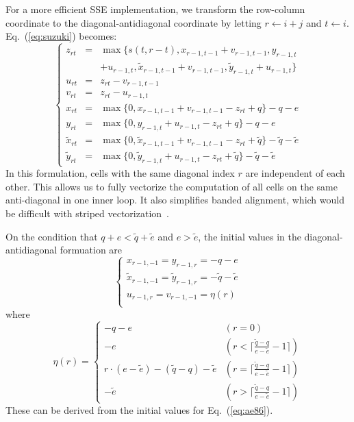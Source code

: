 \documentclass{bioinfo}
\begin{document}
\begin{methods}
For a more efficient SSE implementation, we transform the row-column coordinate
to the diagonal-antidiagonal coordinate by letting $r\gets i+j$ and $t\gets i$.
Eq.~(\ref{eq:suzuki}) becomes:
\begin{equation*}
\left\{\begin{array}{lll}
z_{rt}&=&\max\{s(t,r-t),x_{r-1,t-1}+v_{r-1,t-1},y_{r-1,t}\\
&&+u_{r-1,t},\tilde{x}_{r-1,t-1}+v_{r-1,t-1},\tilde{y}_{r-1,t}+u_{r-1,t}\}\\
u_{rt}&=&z_{rt}-v_{r-1,t-1}\\
v_{rt}&=&z_{rt}-u_{r-1,t}\\
x_{rt}&=&\max\{0,x_{r-1,t-1}+v_{r-1,t-1}-z_{rt}+q\}-q-e\\
y_{rt}&=&\max\{0,y_{r-1,t}+u_{r-1,t}-z_{rt}+q\}-q-e\\
\tilde{x}_{rt}&=&\max\{0,\tilde{x}_{r-1,t-1}+v_{r-1,t-1}-z_{rt}+\tilde{q}\}-\tilde{q}-\tilde{e}\\
\tilde{y}_{rt}&=&\max\{0,\tilde{y}_{r-1,t}+u_{r-1,t}-z_{rt}+\tilde{q}\}-\tilde{q}-\tilde{e}
\end{array}\right.
\end{equation*}
In this formulation, cells with the same diagonal index $r$ are independent of
each other. This allows us to fully vectorize the computation of all cells on
the same anti-diagonal in one inner loop. It also simplifies banded alignment,
which would be difficult with striped vectorization~\citep{Farrar:2007hs}.

On the condition that $q+e<\tilde{q}+\tilde{e}$ and $e>\tilde{e}$, the initial
values in the diagonal-antidiagonal formuation are
\[
\left\{\begin{array}{l}
x_{r-1,-1}=y_{r-1,r}=-q-e\\
\tilde{x}_{r-1,-1}=\tilde{y}_{r-1,r}=-\tilde{q}-\tilde{e}\\
u_{r-1,r}=v_{r-1,-1}=\eta(r)\\
\end{array}\right.
\]
where
\[
\eta(r)=\left\{\begin{array}{ll}
-q-e & (r=0) \\
-e & (r<\lceil\frac{\tilde{q}-q}{e-\tilde{e}}-1\rceil) \\
r\cdot(e-\tilde{e})-(\tilde{q}-q)-\tilde{e} & (r=\lceil\frac{\tilde{q}-q}{e-\tilde{e}}-1\rceil) \\
-\tilde{e} & (r>\lceil\frac{\tilde{q}-q}{e-\tilde{e}}-1\rceil)
\end{array}\right.
\]
These can be derived from the initial values for Eq.~(\ref{eq:ae86}).


\end{methods}
\end{document}
